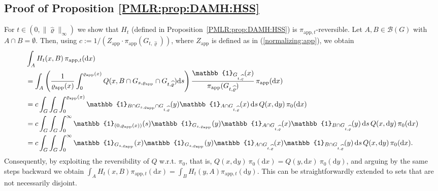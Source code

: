 \documentclass[sn-mathphys-num]{sn-jnl}%
\theoremstyle{thmstyleone}%
\theoremstyle{thmstyletwo}%
\theoremstyle{thmstylethree}%
\newcommand{\rhoapp}{\varrho_{{\rm app}}}
\begin{document}
\begin{appendices}
\subsection{Proof of Proposition \ref{PMLR:prop:DAMH:HSS}}
\label{sec:DAMH:HSS}
For $t\in (0, \|\widehat\varrho\|_\infty)$ we show that $H_t$ (defined in Proposition~\ref{PMLR:prop:DAMH:HSS}) is $\pi_{\text{app},t}$-reversible. Let $A,B\in\mathcal{B}(G)$ with $A\cap B=\emptyset$.
Then, using $c:=1/(Z_{\text{app}}\cdot \pi_{\text{app}}(G_{t, \widehat{\varrho}}))$, where $Z_{\text{app}}$ is defined as in (\ref{normalizing:app}), we obtain
\begin{align*}
	& \int_{A} H_t(x,B)  \, \pi_{\text{app},t}(\mathrm{d}x) \\
	&=\int_{A} \left( \frac{1}{\rhoapp(x)} \int_{0}^{\rhoapp(x)} Q(x,B \cap G_{s,\rhoapp}  \cap  G_{t,\widehat{\varrho}}) \mathrm{d}s \right) \frac{\mathbb{1}_{G_{t,\widehat{\varrho}}}(x)}{\pi_{\text{app}}(G_{t, \widehat{\varrho}})}  \, \pi_{\text{app}}(\mathrm{d}x) \\
	&= c  \int_{G} \int_{G} \int_{0}^{\rhoapp(x)} \mathbb{1}_{B \cap G_{s,\rhoapp} \cap G_{t,\widehat{\varrho}}}(y) \mathbb{1}_{A \cap G_{t,\widehat{\varrho}}}(x)  \, \mathrm{d}s  \, Q(x, \mathrm{d}y)  \, \pi_0(\mathrm{d}x) \\ 
	&= c  \int_{G} \int_{G} \int_{0}^{\infty} \mathbb{1}_{(0,\rhoapp(x))}(s) \mathbb{1}_{G_{s,\rhoapp} }(y) \mathbb{1}_{A \cap  G_{t,\widehat{\varrho}}}(x) \mathbb{1}_{B \cap G_{t,\widehat{\varrho}}}(y)  \, \mathrm{d}s  \, Q(x, \mathrm{d}y)  \, \pi_0(\mathrm{d}x) \\ 
	&= c  \int_{G} \int_{G} \int_{0}^{\infty} \mathbb{1}_{G_{s,\rhoapp} }(x) \mathbb{1}_{G_{s,\rhoapp} }(y) \mathbb{1}_{A \cap  G_{t,\widehat{\varrho}}}(x) \mathbb{1}_{B \cap G_{t,\widehat{\varrho}}}(y)  \, \mathrm{d}s  \, Q(x, \mathrm{d}y)  \, \pi_0(\mathrm{d}x).
\end{align*}
Consequently, by exploiting the reversibility of $Q$ w.r.t. $\pi_0$, that is, $Q(x, \mathrm{d}y) \ \pi_0(\mathrm{d}x) = Q(y, \mathrm{d}x) \ \pi_0(\mathrm{d}y)$, and arguing by the same steps backward we obtain
$\int_{A} H_t(x,B) \pi_{\text{app},t}(\mathrm{d}x) = \int_{B} H_t(y,A) \pi_{\text{app},t}(\mathrm{d}y)$.
This can be straightforwardly extended to sets that are not necessarily disjoint.


\end{appendices}
\end{document}
